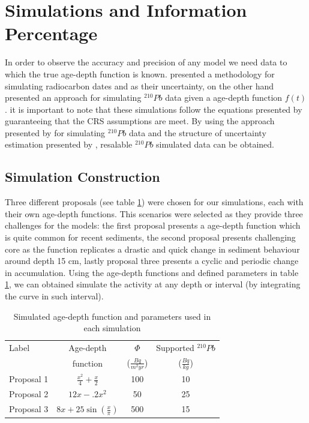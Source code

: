 \documentclass [10pt] {article}
\begin{document}
\section{Simulations and Information Percentage}
	In order to observe the accuracy and precision of any model we need data to which the true age-depth function is known.
\citet{Blaauw2018} presented a methodology for simulating radiocarbon dates and as their uncertainty, on the other hand \citet{Aquino2018} presented an approach for simulating $^{210}Pb$ data given a age-depth function $f(t)$.
it is important to note that these simulations follow the equations presented by \citet*{Appleby1978,Robbins1978} guaranteeing that the CRS assumptions are meet. 
By using the approach presented by \citet{Aquino2018} for simulating $^{210}Pb$ data and the structure of uncertainty estimation presented by \citet{Blaauw2018}, resalable $^{210}Pb$ simulated data can be obtained.

\subsection{Simulation Construction}\label{sec:SimConst}

Three different proposals (see table \ref{tab:sim_param}) were chosen for our simulations, each with their own age-depth functions. 
This scenarios were selected as they provide three challenges for the models: the first proposal presents a age-depth function which is quite common for recent sediments, the second proposal presents challenging core as the function replicates a drastic and quick change in sediment behaviour around depth 15 cm, lastly proposal three presents a cyclic and periodic change in accumulation. 
Using the age-depth functions and defined parameters in table \ref{tab:sim_param}, we can obtained simulate the activity at any depth or interval (by integrating the curve in such interval).

\begin{table}[!h]
	\centering
	\begin{tabular}{l|ccc}
Label    	& 	Age-depth		&	$ \Phi$		& Supported $^{210}Pb$  \\
		&	function		&	($\frac{Bq}{m^2yr }$)	& ($\frac{Bq}{kg}$) 	\\ \hline
Proposal 1 	&	$\frac{x^2}{4} + \frac{x}{2}$	&	100	& 10	\\
Proposal 2 	&	$12x -.2x^2$			&	50	& 25	\\
Proposal 3 	&	$8x+25\sin(\frac{x}{\pi})$	&	500 	& 15		
	\end{tabular}
	\label{tab:sim_param}
	\caption{Simulated age-depth function and parameters used in each simulation}
 \end{table}
\end{document}
